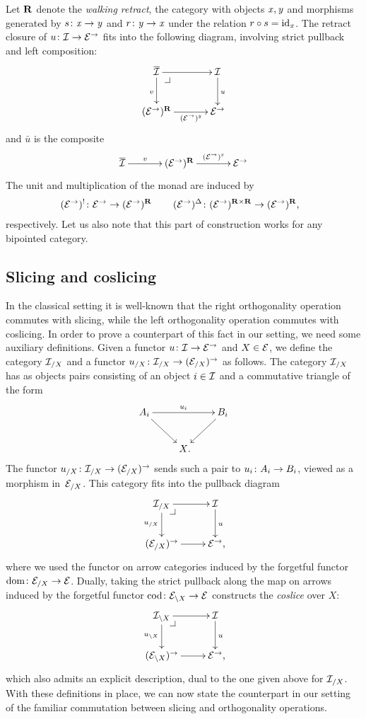 \documentclass[reqno,10pt,a4paper,oneside]{amsart}
\begin{document}
\begin{remark}
Let $\ret$ denote the \emph{walking retract}, \ie the category with objects $\retA, \retB$ and morphisms generated by $s \co \retA \to \retB$ and $r \co \retB \to \retA$ under the relation $r \cc s = \id_{\retA}$.
The retract closure of $u \co \cal{I} \to \catE^\to$ fits into the following diagram, involving strict pullback and left composition:
\[
\xymatrix@C+1em{
  \overline{\cal{I}}
  \ar[r]
  \ar[d]_v
  \pullback{dr}
&
  \cal{I}
  \ar[d]^{u}
\\
  (\catE^\to)^{\ret}
  \ar[r]_-{(\catE^\to)^{\retB}}
&
  \catE^\to
}
\]
and $\bar{u}$ is the composite
\[
\xymatrix@C+1em{
  \overline{\cal{I}} \ar[r]^-v &  (\cal{E}^\to)^\ret \ar[r]^-{(\cal{E}^\to)^\retA} & \cal{E}^\to }
\]
The unit and multiplication of the monad are induced by
\begin{align*}
(\catE^\to)^{\canonical} \co \catE^\to \to (\catE^\to)^{\ret} \, & \qquad
(\catE^\to)^{\Delta} \co (\catE^\to)^{\ret \times \ret} \to (\catE^\to)^{\ret} \rlap{,}
\end{align*}
respectively.
Let us also note that this part of construction works for any bipointed category.
\end{remark}

\subsection*{Slicing and coslicing}
In the classical setting it is well-known that the right orthogonality operation commutes with slicing, while the left orthogonality operation commutes with coslicing.
In order to prove a counterpart of this fact in our setting, we need some auxiliary definitions.
Given a functor $u \co \cal{I} \to \catE^\to$ and $X \in \catE$, we define the category $\cal{I}_{/X}$ and a functor $u_{/X} \co
\cal{I}_{/X} \to (\cal{E}_{/X})^\to$ as follows.
The category $\cal{I}_{/X}$ has as objects pairs consisting of an object $i \in \cal{I}$ and a commutative triangle of the form
\[
\xymatrix{
  A_i \ar[dr] \ar[rr]^{u_i} & & B_i \ar[dl] \\
  & X \rlap{.}
}
\]
The functor $u_{/X} \co \cal{I}_{/X} \to (\cal{E}_{/X})^\to$ sends such a pair to $u_i \co A_i \to B_i$, viewed as a morphism in~$\cal{E}_{/X}$.
This category fits into the pullback diagram
\[
\xymatrix{
  \cal{I}_{/X}
  \ar[r]
  \ar[d]_{u_{/X}}
  \pullback{dr}
&
  \cal{I}
  \ar[d]^{u}
\\
  (\catE_{/X})^\to
  \ar[r]
&
  \catE^\to \rlap{,}
}
\]
where we used the functor on arrow categories induced by the forgetful functor $\operatorname{dom} \co \catE_{/X} \to \catE$.
Dually, taking the strict pullback along the map on arrows induced by the forgetful functor $\operatorname{cod} \co \cal{E}_{\backslash X} \to \catE$ constructs the \emph{coslice} over $X$:
\[
\xymatrix{
 \cal{I}_{\backslash X}
  \ar[r]
  \ar[d]_{u_{\backslash X}}
  \pullback{dr}
&
  \cal{I}
  \ar[d]^{u}
\\
  (\catE_{\backslash X})^\to
  \ar[r]
&
  \catE^\to \rlap{,}
}
\]
which also admits an explicit description, dual to the one given above for $\cal{I}_{/X}$.
With these definitions in place, we can now state the counterpart in our setting of the familiar commutation between slicing and orthogonality operations.
\end{document}
